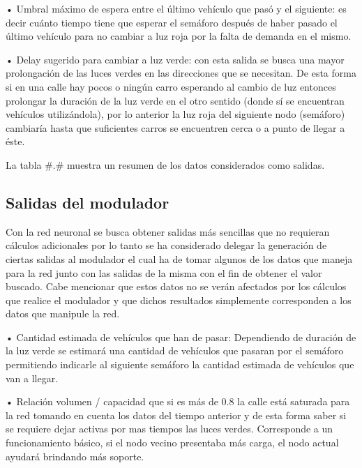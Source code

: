 •	Umbral m\'{a}ximo de espera entre el \'{u}ltimo veh\'{i}culo que pas\'{o} y el siguiente: es decir cu\'{a}nto tiempo tiene que esperar el sem\'{a}foro despu\'{e}s de haber pasado el \'{u}ltimo veh\'{i}culo para no cambiar a luz roja por la falta de demanda en el mismo.

•	Delay sugerido para cambiar a luz verde: con esta salida se busca una mayor prolongaci\'{o}n de las luces verdes en las direcciones que se necesitan. De esta forma si en una calle hay pocos o ning\'{u}n carro esperando al cambio de luz entonces prolongar la duraci\'{o}n de la luz verde en el otro sentido (donde s\'{i} se encuentran veh\'{i}culos utiliz\'{a}ndola), por lo anterior la luz roja del siguiente nodo (sem\'{a}foro) cambiar\'{i}a hasta que suficientes carros se encuentren cerca o a punto de llegar a \'{e}ste.
 
La tabla #.# muestra un resumen de los datos considerados como salidas.

\subsection{Salidas del modulador}
Con la red neuronal se busca obtener salidas m\'{a}s sencillas que no requieran c\'{a}lculos adicionales por lo tanto se ha considerado delegar la generaci\'{o}n de ciertas salidas al modulador el cual ha de tomar algunos de los datos que maneja para la red junto con las salidas de la misma con el fin de obtener el valor buscado. Cabe mencionar que estos datos no se ver\'{a}n afectados por los c\'{a}lculos que realice el modulador y que dichos resultados simplemente corresponden a los datos que manipule la red.

•	Cantidad estimada de veh\'{i}culos que han de pasar: Dependiendo de duraci\'{o}n de la luz verde se estimar\'{a} una cantidad de veh\'{i}culos que pasaran por el sem\'{a}foro permitiendo indicarle al siguiente sem\'{a}foro la cantidad estimada de veh\'{i}culos que van a llegar.

•	Relaci\'{o}n volumen / capacidad que si es m\'{a}s de 0.8 la calle est\'{a} saturada para la red tomando en cuenta los datos del tiempo anterior y de esta forma saber si se requiere dejar activas por mas tiempos las luces verdes. Corresponde a un funcionamiento b\'{a}sico, si el nodo vecino presentaba m\'{a}s carga, el nodo actual ayudar\'{a} brindando m\'{a}s soporte.

